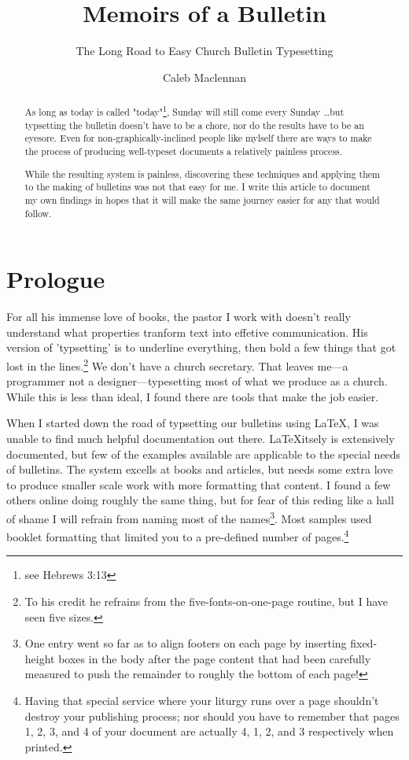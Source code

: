 \documentclass[11pt]{scrartcl}
\title{Memoirs of a Bulletin}
\subtitle{The Long Road to Easy Church Bulletin Typesetting}
\author{Caleb Maclennan}
\begin{document}
\maketitle

\begin{abstract}
As long as today is called "today"\footnote{see Hebrews 3:13}, Sunday will still come every Sunday \dots but typsetting the bulletin doesn't have to be a chore, nor do the results have to be an eyesore. Even for non-graphically-inclined people like mylself there are ways to make the process of producing well-typeset documents a relatively painless process.

While the resulting system is painless, discovering these techniques and applying them to the making of bulletins was not that easy for me. I write this article to document my own findings in hopes that it will make the same journey easier for any that would follow.
\end{abstract}

\section*{Prologue}

For all his immense love of books, the pastor I work with doesn't really understand what properties tranform text into effetive communication. His version of 'typsetting' is to underline everything, then bold a few things that got lost in the lines.\footnote{To his credit he refrains from the five-fonts-on-one-page routine, but I have seen five sizes.} We don't have a church secretary. That leaves me---a programmer not a designer---typesetting most of what we produce as a church. While this is less than ideal, I found there are tools that make the job easier.

When I started down the road of typsetting our bulletins using \LaTeX, I was unable to find much helpful documentation out there. \LaTeX itsely is extensively documented, but few of the examples available are applicable to the special needs of bulletins. The system excells at books and articles, but needs some extra love to produce smaller scale work with more formatting that content. I found a few others online doing roughly the same thing, but for fear of this reding like a hall of shame I will refrain from naming most of the names\footnote{One entry went so far as to align footers on each page by inserting fixed-height boxes in the body after the page content that had been carefully measured to push the remainder to roughly the bottom of each page!}. Most samples used booklet formatting that limited you to a pre-defined number of pages.\footnote{Having that special service where your liturgy runs over a page shouldn't destroy your publishing process; nor should you have to remember that pages 1, 2, 3, and 4 of your document are actually 4, 1, 2, and 3 respectively when printed.}
\end{document}
